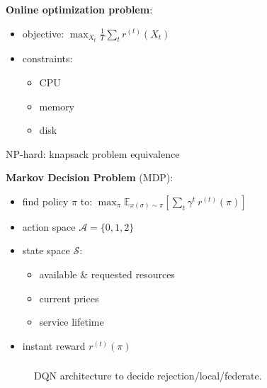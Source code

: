 \documentclass[aspectratio=169]{beamer}
\begin{document}
\begin{frame}
    \frametitle{\secname}
    \framesubtitle{\subsecname}


    \begin{minipage}{.45\textwidth}
        \textbf{Online optimization problem}:
        \begin{itemize}
            \item objective: $\max_{X_t} \frac{1}{T}\sum_t r^{(t)}(X_t)$
            \item constraints:
                \begin{itemize}
                    \item CPU
                    \item memory
                    \item disk
                \end{itemize}
        \end{itemize}
        NP-hard: knapsack problem equivalence
    \end{minipage}\pause
    \hfill
    \vline
    \hfill
    \begin{minipage}{.45\textwidth}
        \textbf{Markov Decision Problem} (MDP):
        \begin{itemize}
            \item find policy $\pi$ to: $\max_\pi \mathbb{E}_{x(\sigma)\sim\pi}\left[ \sum_t \gamma^{t}\ r^{(t)}(\pi) \right]$
            \item action space $\mathcal{A}=\{0,1,2\}$
            \item state space $\mathcal{S}$:
                \begin{itemize}
                    \item available \& requested resources
                    \item current prices
                    \item service lifetime
                \end{itemize}
            \item instant reward $r^{(t)}(\pi)$
        \end{itemize}
    \end{minipage}
    
\end{frame}







\begin{frame}
    \frametitle{\secname}
    \framesubtitle{\subsecname}

    \begin{figure}
        \centering
        
        \caption{DQN architecture to decide rejection/local/federate.}
    \end{figure}
\end{frame}
\end{document}
